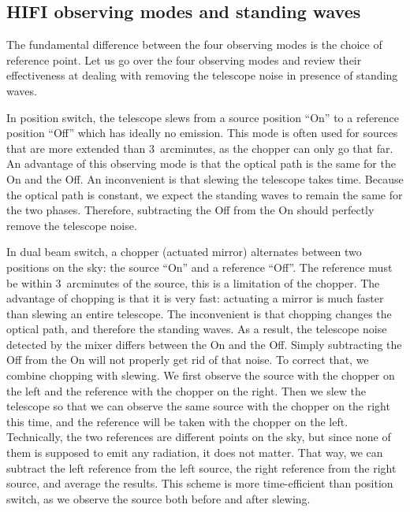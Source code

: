 \subsection{HIFI observing modes and standing waves}
The fundamental difference between the four observing modes is the choice of reference point. Let us go over the four observing modes and review their effectiveness at dealing with removing the telescope noise in presence of standing waves.

In position switch, the telescope slews from a source position ``On'' to a reference position ``Off'' which has ideally no emission.
This mode is often used for sources that are more extended than 3~arcminutes, as the chopper can only go that far.
An advantage of this observing mode is that the optical path is the same for the On and the Off.
An inconvenient is that slewing the telescope takes time.
Because the optical path is constant, we expect the standing waves to remain the same for the two phases.
Therefore, subtracting the Off from the On should perfectly remove the telescope noise.

In dual beam switch, a chopper (actuated mirror) alternates between two positions on the sky: the source ``On'' and a reference ``Off''.
The reference must be within 3~arcminutes of the source, this is a limitation of the chopper.
The advantage of chopping is that it is very fast: actuating a mirror is much faster than slewing an entire telescope.
The inconvenient is that chopping changes the optical path, and therefore the standing waves.
As a result, the telescope noise detected by the mixer differs between the On and the Off.
Simply subtracting the Off from the On will not properly get rid of that noise.
To correct that, we combine chopping with slewing.
We first observe the source with the chopper on the left and the reference with the chopper on the right.
Then we slew the telescope so that we can observe the same source with the chopper on the right this time, and the reference will be taken with the chopper on the left.
Technically, the two references are different points on the sky, but since none of them is supposed to emit any radiation, it does not matter.
That way, we can subtract the left reference from the left source, the right reference from the right source, and average the results.
This scheme is more time-efficient than position switch, as we observe the source both before and after slewing.

